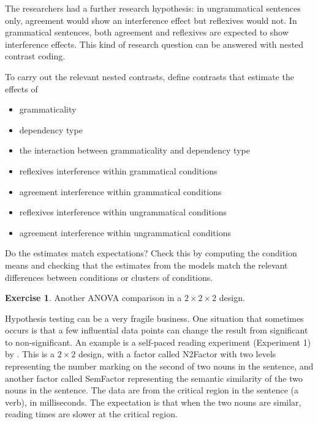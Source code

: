 \documentclass[
  12pt,
]{krantz}
\providecommand{\tightlist}{%
  \setlength{\itemsep}{0pt}\setlength{\parskip}{0pt}}
\theoremstyle{definition}
\theoremstyle{definition}
\theoremstyle{definition}
\newtheorem{exercise}{Exercise}[chapter]
\theoremstyle{definition}
\theoremstyle{remark}
\begin{document}
The researchers had a further research hypothesis: in ungrammatical sentences only, agreement would show an interference effect but reflexives would not. In grammatical sentences, both agreement and reflexives are expected to show interference effects. This kind of research question can be answered with nested contrast coding.

To carry out the relevant nested contrasts, define contrasts that estimate the effects of

\begin{itemize}
\tightlist
\item
  grammaticality
\item
  dependency type
\item
  the interaction between grammaticality and dependency type
\item
  reflexives interference within grammatical conditions
\item
  agreement interference within grammatical conditions
\item
  reflexives interference within ungrammatical conditions
\item
  agreement interference within ungrammatical conditions
\end{itemize}

Do the estimates match expectations? Check this by computing the condition means and checking that the estimates from the models match the relevant differences between conditions or clusters of conditions.

\begin{exercise}
\protect\hypertarget{exr:Contrasts2x2Smith2020}{}\label{exr:Contrasts2x2Smith2020}Another ANOVA comparison in a \(2\times 2\times 2\) design.
\end{exercise}

Hypothesis testing can be a very fragile business. One situation that sometimes occurs is that a few influential data points can change the result from significant to non-significant. An example is a self-paced reading experiment (Experiment 1) by \citet{smith2021encoding}. This is a \(2\times 2\) design, with a factor called N2Factor with two levels representing the number marking on the second of two nouns in the sentence, and another factor called SemFactor representing the semantic similarity of the two nouns in the sentence. The data are from the critical region in the sentence (a verb), in milliseconds. The expectation is that when the two nouns are similar, reading times are slower at the critical region.
\end{document}
